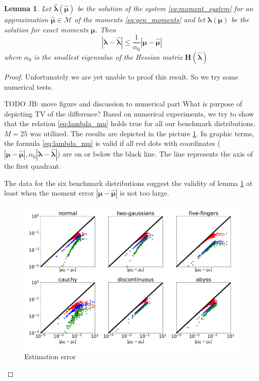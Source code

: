 \documentclass{article}
\newtheorem{lemma}[theorem]{Lemma}
\def\vc#1{\mathbf{\boldsymbol{#1}}}     %
\def\tn#1{\boldsymbol{#1}}
\def\abs#1{|#1|}
\def\vl{{\vc\lambda}}
\def\estvl{{\vc{\hat\lambda}}}
\def\vmu{\vc\mu}
\def\estvmu{{\vc{\hat\mu}}}
\newcommand{\jb}[1]{{\color{violet}#1}}  %
\begin{document}
\begin{lemma}
\label{thm:lambda_est}
Let $\estvl(\estvmu)$ be the solution of the system \eqref{eq:moment_system} for an approximation 
$\estvmu \in \mathcal M$ of the moments \eqref{eq:gen_moments} and let $\vl(\vmu)$ be the solution 
for exact moments $\vmu$. Then
\begin{equation}
\label{eq:lambda_mu}
   \abs{\vl - \estvl} \le \frac{1}{\alpha_0} \abs{\vmu - \estvmu} 
\end{equation}
where $\alpha_0$ is the smallest eigenvalue of the Hessian matrix $\tn H(\estvl)$
\end{lemma}
\begin{proof}
Unfortunately we are yet unable to proof this result. So we try some numerical tests.

\jb{TODO JB: move figure and discussion to numerical part}
\jb{What is purpose of depicting TV of the difference?}
Based on numerical experiments, we try to show that the relation \ref{eq:lambda_mu} holds true for all our benchmark distributions. $M=25$ was utilized.
 The results are depicted in the picture \ref{fig:lambda_kl_tv}. In graphic terms, the formula \ref{eq:lambda_mu} is valid if all red dots with coordinates ($|\vmu - \estvmu|, \alpha_{0}|\vl - \estvl|$) are on or below the black line. The line represents the axis of the first quadrant. 


The data for the six benchmark distributions suggest the validity of lemma \ref{thm:lambda_est} at least when the moment error $|\vmu - \estvmu|$ is not too large.
\begin{figure}[!htb]
\begin{center} 
\includegraphics[width=\textwidth]{lambda_kl_tv.pdf}
\end{center} 
\caption{Estimation error}
\label{fig:lambda_kl_tv}
\end{figure} 



\end{proof}
\end{document}
